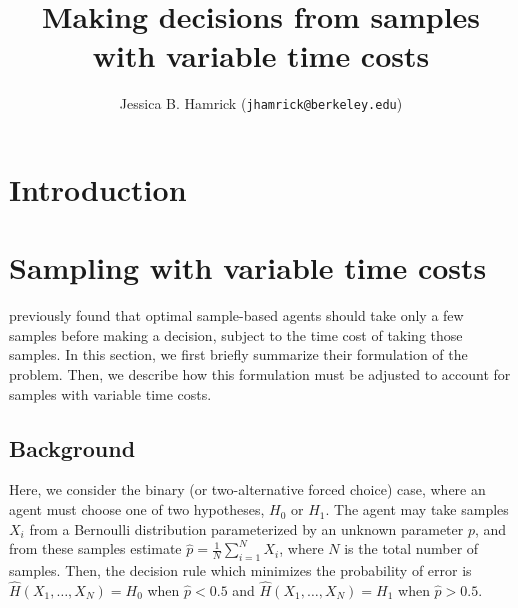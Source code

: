 \documentclass[11pt]{article}
\title{Making decisions from samples with variable time costs}
\author{Jessica B. Hamrick (\texttt{jhamrick@berkeley.edu})}
\date{}
\begin{document}
\maketitle

\section{Introduction}






\section{Sampling with variable time costs}

 previously found that optimal sample-based agents should take only a few samples before making a decision, subject to the time cost of taking those samples. In this section, we first briefly summarize their formulation of the problem. Then, we describe how this formulation must be adjusted to account for samples with variable time costs.

\subsection{Background}

Here, we consider the binary (or two-alternative forced choice) case, where an agent must choose one of two hypotheses, $H_0$ or $H_1$. The agent may take samples $X_i$ from a Bernoulli distribution parameterized by an unknown parameter $p$, and from these samples estimate $\hat{p}=\frac{1}{N}\sum_{i=1}^N X_i$, where $N$ is the total number of samples. Then, the decision rule which minimizes the probability of error is $\hat{H}(X_1,\ldots{},X_N)=H_0$ when $\hat{p}<0.5$ and $\hat{H}(X_1,\ldots{},X_N)=H_1$ when $\hat{p}>0.5$.
\end{document}
